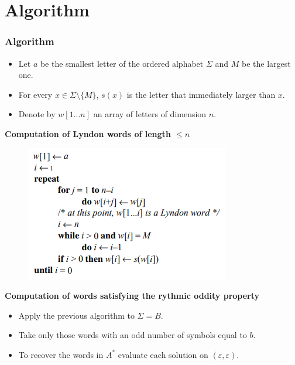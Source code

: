 \documentclass{beamer}
\theoremstyle{definition}
\begin{document}
\section{Algorithm}
\begin{frame}
\frametitle{Algorithm}
\begin{itemize}
\item<1->  Let $a$ be the smallest
letter of the ordered alphabet $\Sigma$ and $M$ be the largest one.
\item<2-> For every $x\in \Sigma\setminus\{M\}$, $s(x)$ is the
letter that immediately larger than $x$. 
\item<3-> Denote by
$w[1...n]$ an array of letters of dimension $n$.
\end{itemize}



\end{frame}

\begin{frame}

\textbf{Computation of Lyndon words of length $\leq n$}

\begin{figure}
\includegraphics[scale=0.8]{algoritmo}
\end{figure}

\end{frame}

\begin{frame}
\textbf{Computation of words satisfying the rythmic oddity property}
\begin{itemize}
\item<2-> Apply the previous algorithm to $\Sigma=B$.
\item<3-> Take only those words with an odd number of symbols equal to $b$. 
\item<4-> To recover the words in $A^*$ evaluate each solution on $(\varepsilon,\varepsilon)$. 
\end{itemize}
\end{frame}
\end{document}
